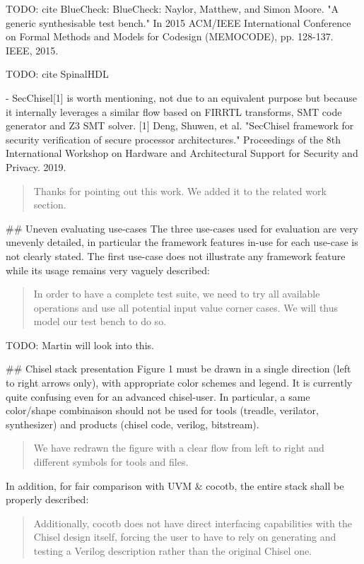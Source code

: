 \documentclass{article}
\newcommand{\todo}[1]{{\color{olive} TODO: #1}}
\newcommand{\reply}[1]{{\color{blue} #1}}
\begin{document}
\todo{cite BlueCheck: BlueCheck: Naylor, Matthew, and Simon Moore. "A generic synthesisable test bench." In 2015 ACM/IEEE International Conference on Formal Methods and Models for Codesign (MEMOCODE), pp. 128-137. IEEE, 2015.}

\todo{cite SpinalHDL}

- SecChisel[1] is worth mentioning, not due to an equivalent purpose but because it internally leverages a similar flow based on FIRRTL transforms, SMT code generator and Z3 SMT solver.
[1] Deng, Shuwen, et al. "SecChisel framework for security verification of secure processor architectures." Proceedings of the 8th International Workshop on Hardware and Architectural Support for Security and Privacy. 2019.

\begin{quote}
\reply{Thanks for pointing out this work. We added it to the related work section.}
\end{quote}


\#\# Uneven evaluating use-cases
The three use-cases used for evaluation are very unevenly detailed, in particular the framework features in-use for each use-case is not clearly stated.
The first use-case does not illustrate any framework feature while its usage remains very vaguely described:
\begin{quote}
In order to have a complete test suite,
we need to try all available operations and use all potential
input value corner cases. We will thus model our test bench
to do so.  
\end{quote}


\todo{Martin will look into this.}

\#\# Chisel stack presentation
Figure 1 must be drawn in a single direction (left to right arrows only), with appropriate color schemes and legend. It is currently quite confusing even for an advanced chisel-user.
In particular, a same color/shape combinaison should not be used for tools (treadle, verilator, synthesizer) and products (chisel code, verilog, bitstream).

\begin{quote}
\reply{We have redrawn the figure with a clear flow from left to right and different symbols for tools and files.}
\end{quote}


In addition, for fair comparison with UVM \& cocotb, the entire stack shall be properly described:

\begin{quote}
Additionally, cocotb does not have direct interfacing
capabilities with the Chisel design itself, forcing the user to
have to rely on generating and testing a Verilog description
rather than the original Chisel one.
\end{quote}
\end{document}
